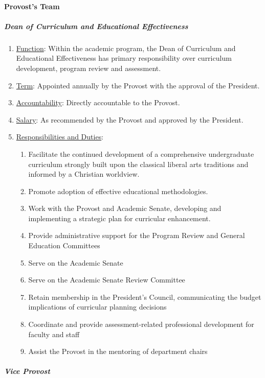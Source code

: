 			\paragraph{Provost’s Team}
				\subparagraph{Dean of Curriculum and Educational Effectiveness}
					\begin{enumerate}
						\item{\underline{Function}:  Within the academic program, the Dean of Curriculum and Educational Effectiveness has primary responsibility over curriculum development, program review and assessment.}
						\item{\underline{Term}:  Appointed annually by the Provost with the approval of the President.}
						\item{\underline{Accountability}:  Directly accountable to the Provost.}
						\item{\underline{Salary}:  As recommended by the Provost and approved by the President.}
						\item{\underline{Responsibilities and Duties}:
							\begin{enumerate}
								\item{Facilitate the continued development of a comprehensive undergraduate curriculum strongly built upon the classical liberal arts traditions and informed by a Christian worldview.}
								\item{Promote adoption of effective educational methodologies.}
								\item{Work with the Provost and Academic Senate, developing and implementing a strategic plan for curricular enhancement.}
								\item{Provide administrative support for the Program Review and General Education Committees}
								\item{Serve on the Academic Senate}
								\item{Serve on the Academic Senate Review Committee}
								\item{ Retain membership in the President's Council, communicating the budget implications of curricular planning decisions}
								\item{ Coordinate and provide assessment-related professional development for faculty and staff}
								\item{ Assist the Provost in the mentoring of department chairs}
							\end{enumerate}
						}
					\end{enumerate}
				\subparagraph{Vice Provost}
